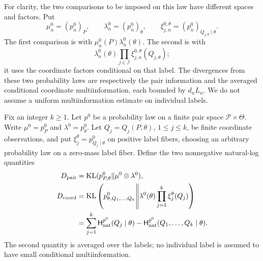 For clarity, the two comparisons to be imposed on this law have
different spaces and factors.  Put
\[
 \mu_n^0=(p_n^0)_P,\qquad
 \lambda_n^0=(p_n^0)_\theta,\qquad
 \xi_{j,n}^{0,\theta}=(p_n^0)_{Q_{j,\theta}\mid\theta}.
\]
The first comparison is with
$\mu_n^0(P)\lambda_n^0(\theta)$.  The second is with
\[
 \lambda_n^0(\theta)
       \prod_{j\in\mathcal I}\xi_{j,n}^{0,\theta}(Q_{j,\theta});
\]
it uses the coordinate factors conditional on that label.
The divergences from these two probability laws are respectively
the pair information and the averaged conditional coordinate
multiinformation, each bounded by $d_nL_n$.  We do not assume a
uniform multiinformation estimate on individual labels.


\begin{lemma}
\label{lem:affine-block-core}
Fix an integer $k\ge1$.  Let $p^0$ be a probability law on a finite pair space
$\mathcal P\times\Theta$.  Write $\mu^0=p^0_P$ and
$\lambda^0=p^0_\theta$.  Let
$Q_j=Q_j(P,\theta)$, $1\le j\le k$, be finite coordinate
observations, and put
$\xi_j^\theta=p^0_{Q_j\mid\theta}$ on positive label fibers, choosing
an arbitrary probability law on a zero-mass label fiber.
Define the two nonnegative natural-log quantities
\begin{align*}
 D_{\mathrm{pair}}
 &=\operatorname{KL}(p^0_{P,\theta}\Vert\mu^0\otimes\lambda^0),\\
 D_{\mathrm{coord}}
 &=\operatorname{KL}\left(p^0_{\theta,Q_1,\ldots,Q_k}
       \middle\Vert
       \lambda^0(\theta)\prod_{j=1}^k\xi_j^\theta(Q_j)\right)\\
 &=\sum_{j=1}^k\mathsf H_{\mathrm{nat}}^{p^0}(Q_j\mid\theta)
       -\mathsf H_{\mathrm{nat}}^{p^0}(Q_1,\ldots,Q_k\mid\theta).
\end{align*}
The second quantity is averaged over the labels; no individual label
is assumed to have small conditional multiinformation.


\end{lemma}
